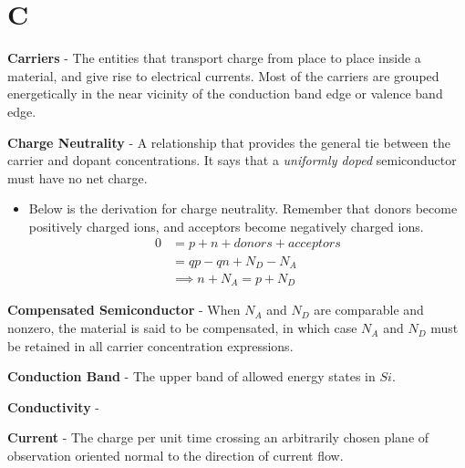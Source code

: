 \section{C}
    \textbf{Carriers} - The entities that transport charge from place to place inside a material, and give rise to electrical currents.  Most of the carriers are grouped energetically in the near vicinity of the conduction band edge or valence band edge.

\vspace{0.5cm}
\noindent
    \textbf{Charge Neutrality} - A relationship that provides the general tie between the carrier and dopant concentrations.  It says that a \emph{uniformly doped} semiconductor must have no net charge.
    \vspace{0.15cm}
    \begin{itemize}
        \setlength\itemsep{0.5em}
        \item Below is the derivation for charge neutrality.  Remember that donors become positively charged ions, and acceptors become negatively charged ions.
        {\begin{align*}
            0 &= p + n + donors + acceptors\\
            &= qp - qn + N_D - N_A\\
            &\implies \boxed{n + N_A = p + N_D}
        \end{align*}}
    \end{itemize}
\vspace{0.5cm}
    \textbf{Compensated Semiconductor} - When $N_A$ and $N_D$ are comparable and nonzero, the material is said to be compensated, in which case $N_A$ and $N_D$ must be retained in all carrier concentration expressions.

\vspace{0.5cm}
\noindent
    \textbf{Conduction Band} - The upper band of allowed energy states in $Si$.

\vspace{0.5cm}
\noindent
    \textbf{Conductivity} -

\vspace{0.5cm}
\noindent
    \textbf{Current} - The charge per unit time crossing an arbitrarily chosen plane of observation oriented normal to the direction of current flow.
